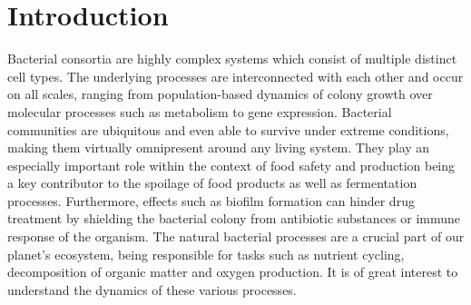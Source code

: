 \documentclass[10pt,A4paper]{article}
\numberwithin{equation}{section}
\begin{document}
\twocolumn

\newpage
%
%
%
%
\section{Introduction}


Bacterial consortia are highly complex systems which consist of multiple distinct cell types.
The underlying processes are interconnected with each other and occur on all scales, ranging from
population-based dynamics of colony growth over molecular processes such as metabolism to gene
expression.
Bacterial communities are ubiquitous and even able to survive under extreme conditions, making them
virtually omnipresent around any living system.
They play an especially important role within the context of food safety and production
being a key contributor to the spoilage of food products as well as fermentation processes.
Furthermore, effects such as biofilm formation can hinder drug treatment by shielding the bacterial
colony from antibiotic substances or immune response of the organism.
The natural bacterial processes are a crucial part of our planet's ecosystem, being responsible for
tasks such as nutrient cycling, decomposition of organic matter and oxygen production.
It is of great interest to understand the dynamics of these various processes.
\end{document}
